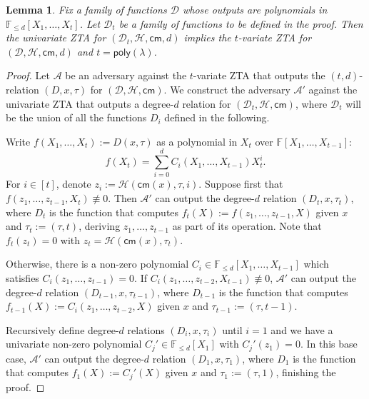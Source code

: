 \documentclass[11pt]{article} %
\newcommand{\F}{\ensuremath{\mathbb F}\xspace}
\newcommand{\adv}{\ensuremath{\mathcal A}\xspace}
\newcommand{\advprime}{\ensuremath{\mathcal{A}'}\xspace}
\newcommand{\cm}{\ensuremath{\mathsf{cm}}\xspace}
\newcommand{\defeq}{:=}
\newcommand{\hash}{\ensuremath{\mathcal{H}}\xspace}
\newtheorem{lemma}{Lemma}[section]
\newcommand{\poly}{\ensuremath{\mathsf{poly(\lambda)}}\xspace}
\newcommand{\ztafuncs}{\ensuremath{\mathcal{D}}\xspace}
\begin{document}
\begin{lemma}
Fix a family of functions \ztafuncs whose outputs are polynomials in $\F_{\leq d}[X_1,\ldots,X_t]$. Let $\ztafuncs_t$ be a family of functions to be defined in the proof. Then the univariate ZTA for $(\ztafuncs_t,\hash,\cm,d)$ implies the $t$-variate ZTA for $(\ztafuncs,\hash,\cm,d)$ and $t=\poly$.
\end{lemma}
\begin{proof}
Let \adv be an adversary against the $t$-variate ZTA that outputs the $(t,d)$-relation $(D,x,\tau)$ for $(\ztafuncs,\hash,\cm)$. We construct the adversary \advprime against the univariate ZTA that outputs a degree-$d$ relation for $(\ztafuncs_t,\hash,\cm)$, where $\ztafuncs_t$ will be the union of all the functions $D_i$ defined in the following.

Write $f(X_1,\ldots,X_t)\defeq D(x,\tau)$ as a polynomial in $X_t$ over $\F[X_1,\ldots,X_{t-1}]$:
\[f(X_t)=\sum_{i=0}^d C_i(X_1,\ldots,X_{t-1}) X_t^i.\]
For $i\in[t]$, denote $z_i\defeq\hash(\cm(x),\tau,i)$. Suppose first that $f(z_1,\ldots,z_{t-1},X_t)\not\equiv 0$. Then \advprime can output the degree-$d$ relation $(D_t,x,\tau_t)$, where $D_t$ is the function that computes $f_t(X)\defeq f(z_1,\ldots,z_{t-1},X)$ given $x$ and $\tau_t\defeq(\tau,t)$, deriving $z_1,\ldots,z_{t-1}$ as part of its operation. Note that $f_t(z_t)=0$ with $z_t=\hash(\cm(x),\tau_t)$.

Otherwise, there is a non-zero polynomial $C_i\in\F_{\leq d}[X_1,\ldots,X_{t-1}]$ which satisfies $C_i(z_1,\ldots,z_{t-1})=0$. If $C_i(z_1,\ldots,z_{t-2},X_{t-1})\not\equiv 0$, \advprime can output the degree-$d$ relation $(D_{t-1},x,\tau_{t-1})$, where $D_{t-1}$ is the function that computes $f_{t-1}(X)\defeq C_i(z_1,\ldots,z_{t-2},X)$ given $x$ and $\tau_{t-1}\defeq(\tau,t-1)$.

Recursively define degree-$d$ relations $(D_i,x,\tau_i)$ until $i=1$ and we have a univariate non-zero polynomial $C_j'\in\F_{\leq d}[X_1]$ with $C_j'(z_1)=0$. In this base case, \advprime can output the degree-$d$ relation $(D_1,x,\tau_1)$, where $D_1$ is the function that computes $f_1(X)\defeq C_j'(X)$ given $x$ and $\tau_1\defeq(\tau,1)$, finishing the proof.
\end{proof}
\end{document}
